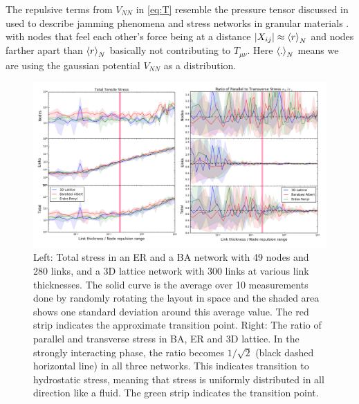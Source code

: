 \documentclass[linenumbers,endfloats,nofootinbib,preprint,floatfix,titlepage,superscriptaddress]{revtex4-1} %
\begin{document}
The repulsive terms from $V_{NN}$ in \eqref{eq:T} resemble the pressure tensor discussed in \citep{stillinger1984packing} used to describe jamming phenomena and stress networks in granular materials  \citep{o2002random,o2003jamming}.  
with nodes that feel each other's force being at a distance $|X_{ij}|\approx \left<r\right>_N$ and nodes farther apart than $\left<r\right>_N$ basically not contributing to $T_{\mu\nu}$. 
Here  $\left<.\right>_N$ means we are using the gaussian potential $V_{NN}$ as a distribution. 
\begin{figure}
    \centering
    \includegraphics[width=1\columnwidth]{fig-09-19/stress3.png}
    \caption{Left: Total stress in an ER and a BA network with 49 nodes and 280 links, and a 3D lattice network with 300 links at various link thicknesses. 
    The solid curve is the average over 10 measurements done by randomly rotating the layout in space and the  shaded area shows one standard deviation around this average value. 
    The red strip indicates the approximate transition point.   
    Right: The ratio of parallel and transverse stress in BA, ER and 3D lattice. In the strongly interacting phase, the ratio becomes $1/\sqrt{2}$ (black dashed horizontal line) in  all three networks. 
    This indicates transition to hydrostatic stress, meaning that stress is uniformly distributed in all direction like a fluid. 
    The green strip indicates the transition point.}
    \label{fig:stress2}
\end{figure}
\end{document}
